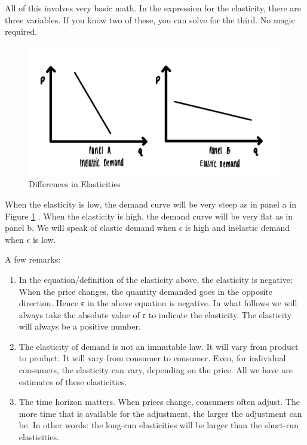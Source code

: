 \documentclass[
]{book}
\begin{document}
All of this involves very basic math. In the expression for the elasticity, there are three variables. If you know two of these, you can solve for the third. No magic required.

\begin{figure}

{\centering \includegraphics[width=1\linewidth]{img/demand/fig4} 

}

\caption{Differences in Elasticities}\label{fig:demand04}
\end{figure}

When the elasticity is low, the demand curve will be very steep as in panel a in Figure \ref{fig:demand04} . When the elasticity is high, the demand curve will be very flat as in panel b. We will speak of elastic demand when \(\epsilon\) is high and inelastic demand when \(\epsilon\) is low.

A few remarks:

\begin{enumerate}
\def\labelenumi{\arabic{enumi}.}
\item
  In the equation/definition of the elasticity above, the elasticity is negative: When the price changes, the quantity demanded goes in the opposite direction. Hence ϵ in the above equation is negative. In what follows we will always take the absolute value of ϵ to indicate the elasticity. The elasticity will always be a positive number.
\item
  The elasticity of demand is not an immutable law. It will vary from product to product. It will vary from consumer to consumer. Even, for individual consumers, the elasticity can vary, depending on the price. All we have are estimates of these elasticities.
\item
  The time horizon matters. When prices change, consumers often adjust. The more time that is available for the adjustment, the larger the adjustment can be. In other words: the long-run elasticities will be larger than the short-run elasticities.
\end{enumerate}
\end{document}
